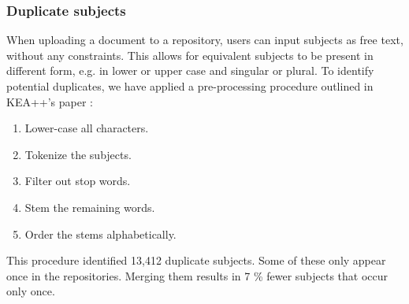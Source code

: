 \subsubsection{Duplicate subjects} \label{subjects_duplicates}

When uploading a document to a repository, users can input subjects as free text, without any constraints. This allows for equivalent subjects to be present in different form, e.g. in lower or upper case and singular or plural. To identify potential duplicates, we have applied a pre-processing procedure outlined in KEA++'s paper \cite{medelyan2008domain}:

\begin{enumerate}
    \item Lower-case all characters.
    \item Tokenize the subjects.
    \item Filter out stop words.
    \item Stem the remaining words.
    \item Order the stems alphabetically.
\end{enumerate}

This procedure identified 13,412 duplicate subjects. Some of these only appear once in the repositories. Merging them results in 7 \% fewer subjects that occur only once.